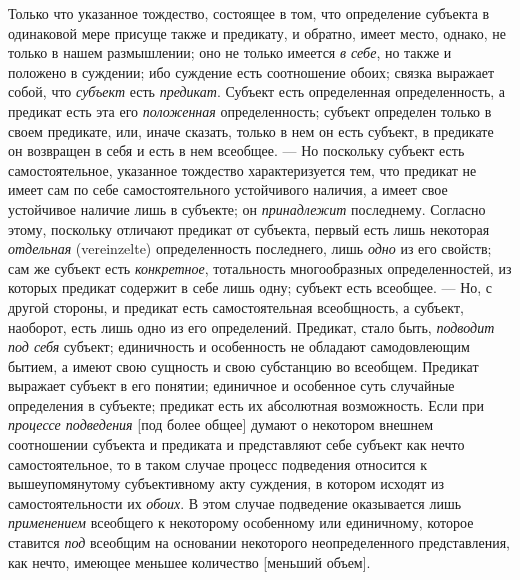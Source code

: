 \documentclass[twoside]{article}
\begin{document}
{{{{Только что указанное тождество, состоящее в том, что
определение субъекта в одинаковой мере присуще также и предикату, и
обратно, имеет место, однако, не только в нашем размышлении; оно не только
имеется {\em в себе}, но
также и положено в суждении; ибо суждение есть соотношение обоих; связка
выражает собой, что {\em субъект}
есть {\em предикат}.
Субъект есть определенная определенность, а предикат есть эта
его {\em положенная}
определенность; субъект определен только в своем предикате,
или, иначе сказать, только в нем он есть субъект, в предикате он возвращен
в себя и есть в нем всеобщее. — Но поскольку субъект есть
самостоятельное, указанное тождество характеризуется тем, что предикат не
имеет сам по себе самостоятельного устойчивого наличия, а имеет свое
устойчивое наличие лишь в субъекте; он
{\em принадлежит}
последнему. Согласно этому, поскольку отличают предикат от
субъекта, первый есть лишь некоторая
{\em отдельная} (vereinzelte)
определенность последнего, лишь
{\em одно} из его
свойств; сам же субъект есть
{\em конкретное},
тотальность многообразных определенностей, из которых
предикат содержит в себе лишь одну; субъект есть всеобщее. —
Но, с другой стороны, и предикат есть самостоятельная
всеобщность, а субъект, наоборот, есть лишь одно из его определений.
Предикат, стало быть, {\em подводит под
себя} субъект; единичность и особенность не обладают
самодовлеющим бытием, а имеют свою сущность и свою субстанцию во всеобщем.
Предикат выражает субъект в его понятии; единичное и особенное суть
случайные определения в субъекте; предикат есть их абсолютная возможность.
Если при {\em процессе подведения}
[под более общее] думают о некотором внешнем соотношении
субъекта и предиката и представляют себе субъект как нечто самостоятельное,
то в таком случае процесс подведения относится к вышеупомянутому
субъективному акту суждения, в котором исходят из самостоятельности их
{\em обоих}. В этом
случае подведение оказывается лишь
{\em применением}
всеобщего к некоторому особенному или единичному, которое
ставится {\em под}
всеобщим на основании некоторого
неопределенного представления, как нечто, имеющее меньшее
количество [меньший объем].

}}}}
\end{document}
